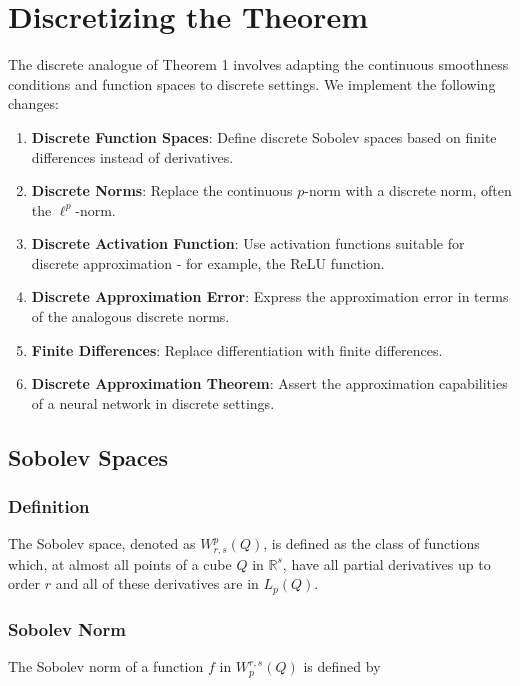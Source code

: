 \documentclass{article}
\begin{document}
\section{Discretizing the Theorem}
The discrete analogue of Theorem 1 involves adapting the continuous smoothness conditions and function spaces to discrete settings. We implement the following changes:

\begin{enumerate}
    \item \textbf{Discrete Function Spaces}: Define discrete Sobolev spaces based on finite differences instead of derivatives.
    \item \textbf{Discrete Norms}: Replace the continuous $p$-norm with a discrete norm, often the $\ell^p$-norm.
    \item \textbf{Discrete Activation Function}: Use activation functions suitable for discrete approximation - for example, the ReLU function.
    \item \textbf{Discrete Approximation Error}: Express the approximation error in terms of the analogous discrete norms.
    \item \textbf{Finite Differences}: Replace differentiation with finite differences.
    \item \textbf{Discrete Approximation Theorem}: Assert the approximation capabilities of a neural network in discrete settings.
\end{enumerate}

\subsection{Sobolev Spaces}

\subsubsection{Definition}

The Sobolev space, denoted as \( W^{p}_{r,s}(Q) \), is defined as the class of functions which, at almost all points of a cube \( Q \) in \( \mathbb{R}^s \), have all partial derivatives up to order \( r \) and all of these derivatives are in \( L_p(Q) \).

\subsubsection{Sobolev Norm}
The Sobolev norm of a function \( f \) in \( W^{r,s}_p(Q) \) is defined by
\end{document}
